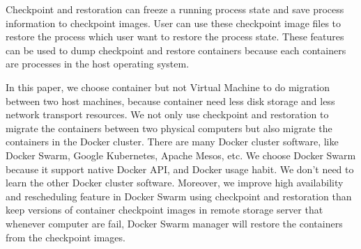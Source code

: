 Checkpoint and restoration can freeze a running process state and save process information to checkpoint images. User can use these checkpoint image files to restore the process which user want to restore the process state. These features can be used to dump checkpoint and restore containers because each containers are processes in the host operating system.

In this paper, we choose container but not Virtual Machine to do migration between two host machines, because container need less disk storage and less network transport resources. We not only use checkpoint and restoration to migrate the containers between two physical computers but also migrate the containers in the Docker cluster.
There are many Docker cluster software, like Docker Swarm, Google Kubernetes, Apache Mesos, etc. We choose Docker Swarm because it support native Docker API, and Docker usage habit. We don't need to learn the other Docker cluster software.
Moreover, we improve high availability and rescheduling feature in Docker Swarm using checkpoint and restoration than keep versions of container checkpoint images in remote storage server that whenever computer are fail, Docker Swarm manager will restore the containers from the checkpoint images.
